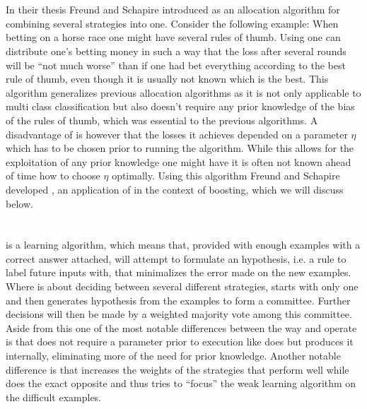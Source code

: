 \newpage \section{\hedge}
In their thesis Freund and Schapire introduced \hedge as an allocation algorithm for combining several strategies into one. Consider the following example: When betting on a horse race one might have several rules of thumb. Using \hedge one can distribute one's betting money in such a way that the loss after several rounds will be ``not much worse'' than if one had bet everything according to the best rule of thumb, even though it is usually not known which is the best. This algorithm generalizes previous allocation algorithms as it is not only applicable to multi class classification but also doesn't require any prior knowledge of the bias of the rules of thumb, which was essential to the previous algorithms. A disadvantage of \hedge is however that the losses it achieves depended on a parameter $\eta$ which has to be chosen prior to running the algorithm. While this allows for the exploitation of any prior knowledge one might have it is often not known ahead of time how to choose $\eta$ optimally. Using this \hedge algorithm Freund and Schapire developed \adaB, an application of \hedge in the context of boosting, which we will discuss below. 

\section{\adaB}
\adaB is a learning algorithm, which means that, provided with enough examples with a correct answer attached, \adaB will attempt to formulate an hypothesis, i.e. a rule to label future inputs with, that minimalizes the error made on the new examples. Where \hedge is about deciding between several different strategies, \adaB starts with only one and then generates hypothesis from the examples to form a committee. Further decisions will then be made by a weighted majority vote among this committee. Aside from this one of the most notable differences between the way \hedge and \adaB operate is that \adaB does not require a parameter prior to execution like \hedge does but produces it internally, eliminating more of the need for prior knowledge. Another notable difference is that \hedge increases the weights of the strategies that perform well while \adaB does the exact opposite and thus tries to ``focus'' the weak learning algorithm on the difficult examples. 

